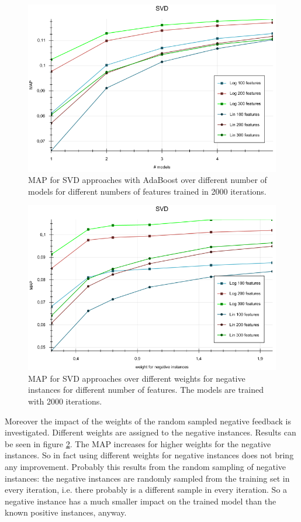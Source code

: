\documentclass[10pt]{reportMaster}
\begin{document}
\begin{figure}
	\centering
	\includegraphics[width=1\textwidth]{figures/experiments/SVDModels}
	\caption{MAP for SVD approaches with AdaBoost over different number of models for different numbers of features trained in 2000 iterations.}
	\label{fig:SVDModels}
\end{figure}


\begin{figure}
	\centering
	\includegraphics[width=1\textwidth]{figures/experiments/SVDWeights}
	\caption{MAP for SVD approaches over different weights for negative instances for different number of features. The models are trained with 2000 iterations.}
	\label{fig:SVDWeights}
\end{figure}

Moreover the impact of the weights of the random sampled negative feedback is investigated.
Different weights are assigned to the negative instances.
Results can be seen in figure \ref{fig:SVDWeights}.
The MAP increases for higher weights for the negative instances.
So in fact using different weights for negative instances does not bring any improvement.
Probably this results from the random sampling 
of negative instances: the negative instances are randomly sampled from the training set in every iteration, i.e. there probably is a different sample in every iteration.
So a negative instance has a much smaller impact on the trained model than the known positive instances, anyway.
\end{document}
